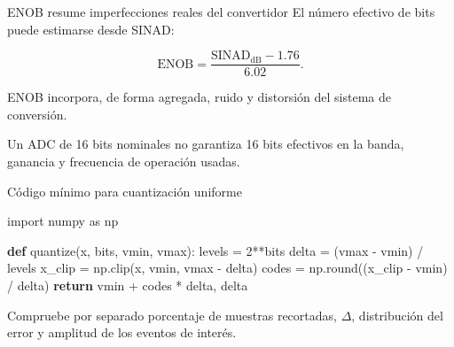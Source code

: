 \documentclass[
  ignorenonframetext,
  aspectratio=169,
  spanish,
  professionalfonts]{beamer}
\newenvironment{Shaded}{\begin{snugshade}}{\end{snugshade}}
\newcommand{\BuiltInTok}[1]{\textcolor[rgb]{0.00,0.23,0.31}{#1}}
\newcommand{\ControlFlowTok}[1]{\textcolor[rgb]{0.00,0.23,0.31}{\textbf{#1}}}
\newcommand{\DecValTok}[1]{\textcolor[rgb]{0.68,0.00,0.00}{#1}}
\newcommand{\ImportTok}[1]{\textcolor[rgb]{0.00,0.46,0.62}{#1}}
\newcommand{\KeywordTok}[1]{\textcolor[rgb]{0.00,0.23,0.31}{\textbf{#1}}}
\newcommand{\NormalTok}[1]{\textcolor[rgb]{0.00,0.23,0.31}{#1}}
\newcommand{\OperatorTok}[1]{\textcolor[rgb]{0.37,0.37,0.37}{#1}}
\begin{document}
\begin{frame}{ENOB resume imperfecciones reales del convertidor}
\protect{}\label{enob-resume-imperfecciones-reales-del-convertidor}
El número efectivo de bits puede estimarse desde SINAD:

\[
\mathrm{ENOB}=\frac{\mathrm{SINAD}_{\mathrm{dB}}-1.76}{6.02}.
\]

ENOB incorpora, de forma agregada, ruido y distorsión del sistema de
conversión.

\begin{tcolorbox}[enhanced jigsaw, arc=.35mm, bottomrule=.15mm, bottomtitle=1mm, breakable, colback=white, colbacktitle=quarto-callout-note-color!10!white, colframe=quarto-callout-note-color-frame, coltitle=black, left=2mm, leftrule=.75mm, opacityback=0, opacitybacktitle=0.6, rightrule=.15mm, title={No confundir}, titlerule=0mm, toprule=.15mm, toptitle=1mm]

Un ADC de 16 bits nominales no garantiza 16 bits efectivos en la banda,
ganancia y frecuencia de operación usadas.

\end{tcolorbox}
\end{frame}

\begin{frame}[fragile]{Código mínimo para cuantización uniforme}
\protect{}\label{cuxf3digo-muxednimo-para-cuantizaciuxf3n-uniforme}
\begin{Shaded}
\begin{Highlighting}[]
\ImportTok{import}\NormalTok{ numpy }\ImportTok{as}\NormalTok{ np}

\KeywordTok{def}\NormalTok{ quantize(x, bits, vmin, vmax):}
\NormalTok{    levels }\OperatorTok{=} \DecValTok{2}\OperatorTok{**}\NormalTok{bits}
\NormalTok{    delta }\OperatorTok{=}\NormalTok{ (vmax }\OperatorTok{{-}}\NormalTok{ vmin) }\OperatorTok{/}\NormalTok{ levels}
\NormalTok{    x\_clip }\OperatorTok{=}\NormalTok{ np.clip(x, vmin, vmax }\OperatorTok{{-}}\NormalTok{ delta)}
\NormalTok{    codes }\OperatorTok{=}\NormalTok{ np.}\BuiltInTok{round}\NormalTok{((x\_clip }\OperatorTok{{-}}\NormalTok{ vmin) }\OperatorTok{/}\NormalTok{ delta)}
    \ControlFlowTok{return}\NormalTok{ vmin }\OperatorTok{+}\NormalTok{ codes }\OperatorTok{*}\NormalTok{ delta, delta}
\end{Highlighting}
\end{Shaded}

\begin{tcolorbox}[enhanced jigsaw, arc=.35mm, bottomrule=.15mm, bottomtitle=1mm, breakable, colback=white, colbacktitle=quarto-callout-tip-color!10!white, colframe=quarto-callout-tip-color-frame, coltitle=black, left=2mm, leftrule=.75mm, opacityback=0, opacitybacktitle=0.6, rightrule=.15mm, title={Verificación computacional}, titlerule=0mm, toprule=.15mm, toptitle=1mm]

Compruebe por separado porcentaje de muestras recortadas, \(\Delta\),
distribución del error y amplitud de los eventos de interés.

\end{tcolorbox}
\end{frame}
\end{document}
